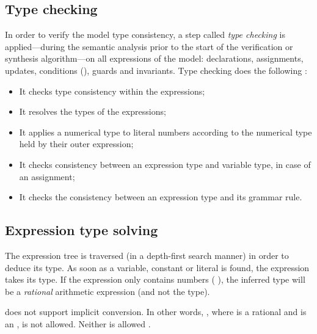\subsection{Type checking}

In order to verify the model type consistency, a step called \emph{type checking} is applied---during the semantic analysis prior to the start of the verification or synthesis algorithm---on all expressions of the model: declarations, assignments, updates, conditions (), guards and invariants.
Type checking does the following :

\begin{itemize}
	\item It checks type consistency within the expressions;
	\item It resolves the types of the expressions;
	\item It applies a numerical type to literal numbers according to the numerical type held by their outer expression;
	\item It checks consistency between an expression type and variable type, in case of an assignment;
	\item It checks the consistency between an expression type and its grammar rule.
\end{itemize}

\subsection{Expression type solving}

The expression tree is traversed (in a depth-first search manner) in order to deduce its type.
As soon as a variable, constant or literal is found, the expression takes its type.
If the expression only contains numbers (\eg{} ), the inferred type will be a \emph{rational} arithmetic expression (and not the  type).

\imitator{} does not support implicit conversion.
In other words, , where  is a rational and  is an , is not allowed.
Neither is allowed .


